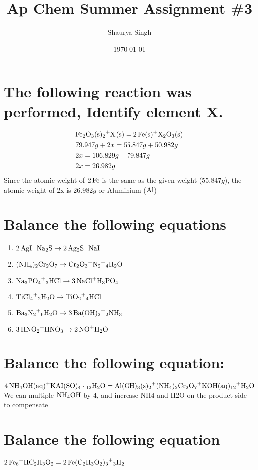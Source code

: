 \documentclass{scrartcl}
\author{Shaurya Singh}
\date{\today}
\title{Ap Chem Summer Assignment \#3}
\begin{document}
\maketitle

\section{The following reaction was performed, Identify element X.}
\label{sec:org3beaa0a}
\begin{align*}
  &\ce{Fe2O_3(s)+2X(s)} = \ce{2Fe(s)+X_2O_3(s)}\\
  &79.947g+2x=55.847g+50.982g\\
  &2x=106.829g-79.847g\\
  &2x=26.982g\\
\end{align*}
Since the atomic weight of \(\ce{2Fe}\) is the same as the given weight
(\(55.847g\)), the atomic weight of 2x is \(26.982g\) or Aluminium (\(\ce{Al}\))

\section{Balance the following equations}
\label{sec:orga41ebb2}
\begin{enumerate}
\item \(\ce{2AgI+Na2S} \rightarrow \ce{2Ag2S+NaI}\)
\item \(\ce{(NH4)2Cr2O7} \rightarrow \ce{Cr2O3+N2+4H2O}\)
\item \(\ce{Na3PO4+3HCl} \rightarrow \ce{3NaCl+H3PO4}\)
\item \(\ce{TiCl4+2H2O} \rightarrow \ce{TiO2+4HCl}\)
\item \(\ce{Ba3N2+6H2O} \rightarrow \ce{3Ba(OH)2+2NH3}\)
\item \(\ce{3HNO2+HNO3} \rightarrow \ce{2NO+H2O}\)
\end{enumerate}

\section{Balance the following equation:}
\label{sec:orgcf3c50c}
\(\ce{4NH4OH(aq)+KAI(SO)4\cdot12H2O}=\ce{Al(OH)3(s)+2(NH4)2Cr2O7+KOH(aq)+12H2O}\)
We can multiple \(\ce{NH4OH}\) by 4, and increase NH4 and H2O on the product
side to compensate

\section{Balance the following equation}
\label{sec:org2187d48}
\(\ce{2Fe+6HC2H3O2}=\ce{2Fe(C2H3O2)3+3H2}\)
\end{document}
